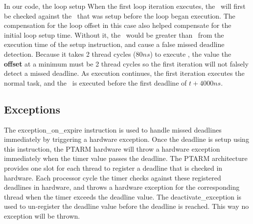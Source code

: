 In our code, the loop setup
When the first loop iteration executes, the \currentt\ will first be checked against the \deadlinet\ that was setup before the loop began execution.
The compensation for the loop offset in this case also helped compensate for the initial loop setup time.
Without it, the \currentt\ would be greater than \deadlinet\ from the execution time of the setup \gettime instruction, and cause a false missed deadline detection.
Because it takes 2 thread cycles ($80ns$) to execute \gettime, the value the \textbf{offset} at a minimum must be 2 thread cycles so the first iteration will not falsely detect a missed deadline.  
As execution continues, the first iteration executes the normal task, and the \delayuntil\ is executed before the first deadline of $t+4000ns$.




\subsection{Exceptions}
The exception\_on\_expire instruction is used to handle missed deadlines immediately by triggering a hardware exception. 
Once the deadline is setup using this instruction, the PTARM hardware will throw a hardware exception immediately when the timer value passes the deadline.
The PTARM architecture provides one slot for each thread to register a deadline that is checked in hardware.
Each processor cycle the timer checks against these registered deadlines in hardware, and throws a hardware exception for the corresponding thread when the timer exceeds the deadline value. 
The deactivate\_exception is used to un-register the deadline value before the deadline is reached. 
This way no exception will be thrown.

